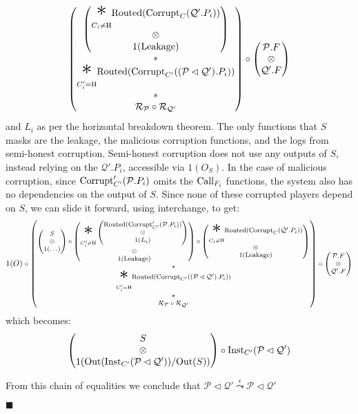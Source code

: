\begin{theorem}
$$\begin{pmatrix}
\begin{pmatrix}
    {\displaystyle \bigast_{C_i \neq \tx{H}}}
    \tx{Routed}(\tx{Corrupt}_C(\mathcal{Q}'.P_i))
    \cr
    \otimes\cr
    1(\tx{Leakage})
    \end{pmatrix}
    \cr
    *\cr
    {\displaystyle \bigast_{C'_i = \tx{H}}}
    \tx{Routed}(\tx{Corrupt}_{C'}((\mathcal{P} \lhd \mathcal{Q}').P_i))\cr
    *\cr
    \mathcal{R}_{\mathcal{P}} \circ \mathcal{R}_{\mathcal{Q}'}\cr
  \end{pmatrix}
  \circ
  \begin{pmatrix}
    \mathcal{P}.F\cr
    \otimes\cr
    \mathcal{Q}'.F
  \end{pmatrix}
  $$
  and $L_i$ as per the horizontal breakdown theorem.
  The only functions that $S$ masks are the leakage, the malicious corruption
  functions, and the logs from semi-honest corruption.
  Semi-honest corruption does not use any outputs of $S$,
  instead relying on the $\mathcal{Q}'.P_i$, accessible via $1(O_S)$.
  In the case of malicious corruption, since $\text{Corrupt}'_{C'}(\mathcal{P}.P_i)$
  omits the $\text{Call}_{F_i}$ functions, the system also has no dependencies
  on the output of $S$.
  Since none of these corrupted players depend on $S$,
  we can slide it forward, using interchange, to get:
  $$
  \footnotesize
  1(O) \circ
  \begin{pmatrix}
    \begin{pmatrix}
      S\cr
      \otimes\cr
      1(\ldots)
    \end{pmatrix}
    \circ
    \begin{pmatrix}
    {\displaystyle \bigast_{C'_i \neq \tx{H}}}
    \begin{pmatrix}
      \tx{Routed}(\tx{Corrupt}'_{C'}(\mathcal{P}.P_i))\cr
      \otimes\cr
      1(L_i)
    \end{pmatrix}\cr
    \otimes\cr
    1(\tx{Leakage})
    \end{pmatrix}
    \circ
    \begin{pmatrix}
    {\displaystyle \bigast_{C_i \neq \tx{H}}}
    \tx{Routed}(\tx{Corrupt}_C(\mathcal{Q}'.P_i))
    \cr
    \otimes\cr
    1(\tx{Leakage})
    \end{pmatrix}
    \cr
    *\cr
    {\displaystyle \bigast_{C'_i = \tx{H}}}
    \tx{Routed}(\tx{Corrupt}_{C'}((\mathcal{P} \lhd \mathcal{Q}').P_i))\cr
    *\cr
    \mathcal{R}_{\mathcal{P}} \circ \mathcal{R}_{\mathcal{Q}'}\cr
  \end{pmatrix}
  \circ
  \begin{pmatrix}
    \mathcal{P}.F\cr
    \otimes\cr
    \mathcal{Q}'.F
  \end{pmatrix}
  $$
  which becomes:
  $$
  \begin{pmatrix}
    S\cr
    \otimes\cr
    1(\text{Out}(\text{Inst}_{C'}(\mathcal{P} \lhd \mathcal{Q}')) / \text{Out}(S))
  \end{pmatrix}
  \circ
  \text{Inst}_{C'}(\mathcal{P} \lhd \mathcal{Q}')
  $$

  From this chain of equalities we conclude that
  $\mathcal{P} \lhd \mathcal{Q}' \overset{\epsilon}{\leadsto} \mathcal{P} \lhd \mathcal{Q}'$

  $\blacksquare$
\end{theorem}


